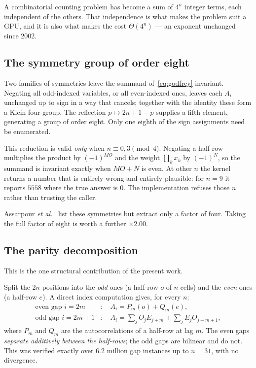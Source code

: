 \documentclass[11pt,a4paper]{article}
\begin{document}
A combinatorial counting problem has become a sum of $4^n$ integer terms, each
independent of the others. That independence is what makes the problem suit a
GPU, and it is also what makes the cost $\Theta(4^n)$ --- an exponent unchanged
since 2002.

\subsection{The symmetry group of order eight}

Two families of symmetries leave the summand of~\eqref{eq:godfrey} invariant.
Negating all odd-indexed variables, or all even-indexed ones, leaves each $A_i$
unchanged up to sign in a way that cancels; together with the identity these
form a Klein four-group. The reflection $p \mapsto 2n+1-p$ supplies a fifth
element, generating a group of order eight. Only one eighth of the sign
assignments need be enumerated.

This reduction is valid \emph{only} when $n \equiv 0,3 \pmod 4$. Negating a
half-row multiplies the product by $(-1)^{MO}$ and the weight $\prod_k x_k$ by
$(-1)^{N}$, so the summand is invariant exactly when $MO + N$ is even. At other
$n$ the kernel returns a number that is entirely wrong and entirely plausible:
for $n=9$ it reports $5558$ where the true answer is $0$. The implementation
refuses those $n$ rather than trusting the caller.

Assarpour \emph{et al.}~\cite{abl} list these symmetries but extract only a
factor of four. Taking the full factor of eight is worth a further $\times 2.00$.

\subsection{The parity decomposition}
\label{sec:parity}

This is the one structural contribution of the present work.

Split the $2n$ positions into the \emph{odd} ones (a half-row $o$ of $n$ cells)
and the \emph{even} ones (a half-row $e$). A direct index computation gives, for
every $n$:
\begin{align}
  \text{even gap } i = 2m   &: \quad A_i = P_m(o) + Q_m(e), \label{eq:even}\\
  \text{odd gap } i = 2m+1 &: \quad A_i = \textstyle\sum_j O_j E_{j+m}
                                        + \sum_j E_j O_{j+m+1}, \label{eq:odd}
\end{align}
where $P_m$ and $Q_m$ are the autocorrelations of a half-row at lag $m$. The
even gaps \emph{separate additively between the half-rows}; the odd gaps are
bilinear and do not. This was verified exactly over $6.2$ million gap instances
up to $n=31$, with no divergence.
\end{document}
